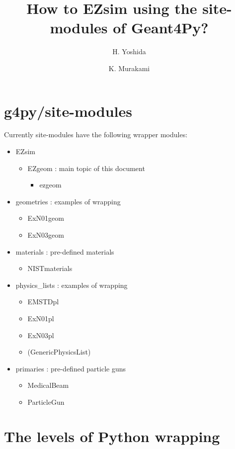 \documentclass{article}
\title{How to EZsim using the site-modules of Geant4Py?}
\author{ H. Yoshida \and K. Murakami}
\begin{document}
\maketitle
\section{g4py/site-modules}

Currently site-modules have the following wrapper modules:
\begin{itemize}
  \item EZsim
        \begin{itemize}
         \item EZgeom : main topic of this document
        \begin{itemize}
          \item ezgeom
        \end{itemize}
        \end{itemize}
  \item  geometries : examples of wrapping
        \begin{itemize}
        \item  ExN01geom
        \item ExN03geom
        \end{itemize}
  \item materials : pre-defined materials
        \begin{itemize}
        \item NISTmaterials
        \end{itemize}
  \item physics\_lists : examples of wrapping
        \begin{itemize}
        \item EMSTDpl
        \item ExN01pl
        \item ExN03pl
        \item (GenericPhysicsList)
        \end{itemize}
  \item primaries : pre-defined particle guns
        \begin{itemize}
        \item MedicalBeam
        \item ParticleGun
        \end{itemize}
\end{itemize}

\section{The levels of Python wrapping}
\end{document}
